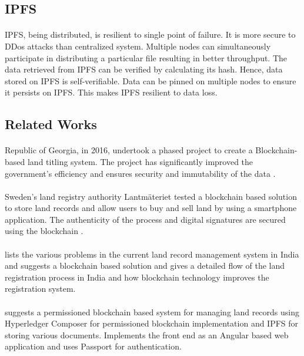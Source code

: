\documentclass{article}
\begin{document}
    \subsection{IPFS}
        \paragraph{}
        IPFS, being distributed, is resilient to single point of failure. It is more secure to DDos attacks than centralized system. Multiple nodes can simultaneously participate in distributing a particular file resulting in better throughput. The data retrieved from IPFS can be verified by calculating its hash. Hence, data stored on IPFS is self-verifiable. Data can be pinned on multiple nodes to ensure it persists on IPFS. This makes IPFS resilient to data loss.

    \subsection{Related Works}
        \paragraph{}
        Republic of Georgia, in 2016, undertook a phased project to create a Blockchain-based land titling system. The project has significantly improved the government’s efficiency and ensures security and immutability of the data \cite{10.1162/inov_a_00276}.

        \paragraph{}
        Sweden’s land registry authority Lantmäteriet tested a blockchain based solution to store land records and allow users to buy and sell land by using a smartphone application. The authenticity of the process and digital signatures are secured using the blockchain \cite{sweden}.
        
        \paragraph{}
        \cite{THAKUR2020101940} lists the various problems in the current land record management system in India and suggests a blockchain based solution and gives a detailed flow of the land registration process in India and how blockchain technology improves the registration system.

        \paragraph{}
        \cite{8944471} suggests a permissioned blockchain based system for managing land records using Hyperledger Composer for permissioned blockchain implementation and IPFS for storing various documents. Implements the front end as an Angular based web application and uses Passport for authentication.
\end{document}
